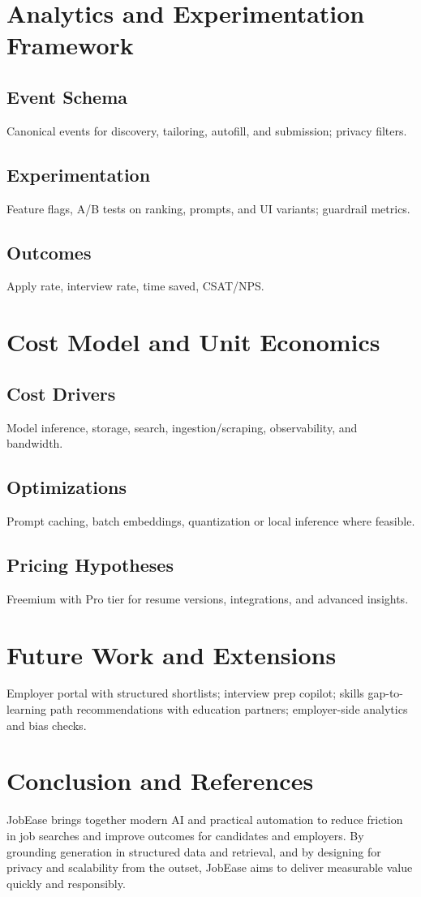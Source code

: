 \documentclass[12pt,a4paper]{article}
\begin{document}
\section{Analytics and Experimentation Framework}
\subsection{Event Schema}
Canonical events for discovery, tailoring, autofill, and submission; privacy filters.
\subsection{Experimentation}
Feature flags, A/B tests on ranking, prompts, and UI variants; guardrail metrics.
\subsection{Outcomes}
Apply rate, interview rate, time saved, CSAT/NPS.

\section{Cost Model and Unit Economics}
\subsection{Cost Drivers}
Model inference, storage, search, ingestion/scraping, observability, and bandwidth.
\subsection{Optimizations}
Prompt caching, batch embeddings, quantization or local inference where feasible.
\subsection{Pricing Hypotheses}
Freemium with Pro tier for resume versions, integrations, and advanced insights.

\section{Future Work and Extensions}
Employer portal with structured shortlists; interview prep copilot; skills gap-to-learning path recommendations with education partners; employer-side analytics and bias checks.

\section{Conclusion and References}
JobEase brings together modern AI and practical automation to reduce friction in job searches and improve outcomes for candidates and employers. By grounding generation in structured data and retrieval, and by designing for privacy and scalability from the outset, JobEase aims to deliver measurable value quickly and responsibly.
\end{document}
